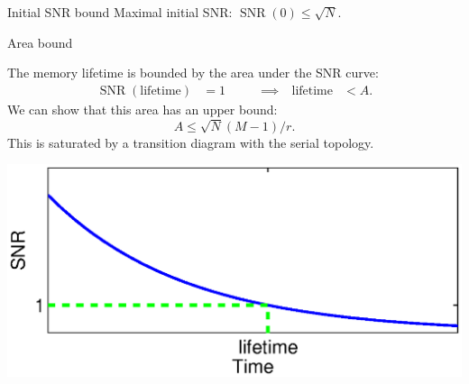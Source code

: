 \documentclass[final,hyperref={pdfpagelabels=false,bookmarks=false}]{beamer}
\DeclareMathOperator{\SNR}{SNR}
\DeclareMathOperator{\snr}{SNR}
\begin{document}
\begin{frame}{}
\begin{columns}[t]
\begin{column}{0.29\linewidth}
\begin{block}{Initial SNR bound}
 \vp Maximal initial SNR:\hspace{2cm}
 $
   \snr(0) \leq \sqrt{N}.
 $
%
\end{block}



\begin{block}{Area bound}
%
 \parbox[c]{0.6\linewidth}{
  The memory lifetime is bounded by the area under the SNR curve:
  \begin{equation*}
  \begin{aligned}
    \SNR(\text{lifetime})&=1
    &\qquad
    \implies
    \quad
    \text{lifetime} &< A.
  \end{aligned}
  \end{equation*}
  We can show that this area has an upper bound:
  \begin{equation*}
    A \leq \sqrt{N}(M-1)/r.
  \end{equation*}
  This is saturated by a transition diagram with the serial topology.
 }
 \hfill
 \parbox[c]{0.37\linewidth}{
  \begin{center}
    \includegraphics[width=0.9375\linewidth]{lifetime.eps}
  \end{center}
 }
%
\end{block}


\end{column}
\end{columns}
\end{frame}
\end{document}
